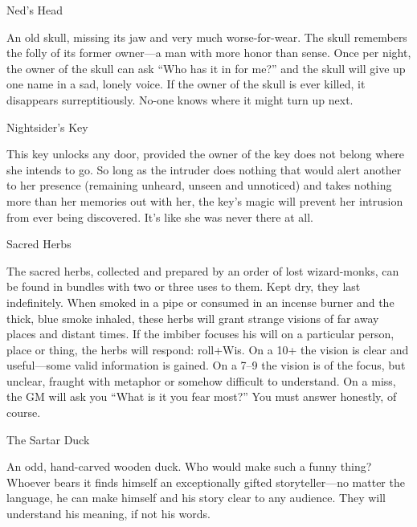  

Ned's Head	 

 

An old skull, missing its jaw and very much worse-for-wear. The skull remembers the folly of its former owner—a man with more honor than sense. Once per night, the owner of the skull can ask “Who has it in for me?” and the skull will give up one name in a sad, lonely voice. If the owner of the skull is ever killed, it disappears surreptitiously. No-one knows where it might turn up next.

 

Nightsider's Key	 

 

This key unlocks any door, provided the owner of the key does not belong where she intends to go. So long as the intruder does nothing that would alert another to her presence (remaining unheard, unseen and unnoticed) and takes nothing more than her memories out with her, the key’s magic will prevent her intrusion from ever being discovered. It’s like she was never there at all.

 

Sacred Herbs	 

 

The sacred herbs, collected and prepared by an order of lost wizard-monks, can be found in bundles with two or three uses to them. Kept dry, they last indefinitely. When smoked in a pipe or consumed in an incense burner and the thick, blue smoke inhaled, these herbs will grant strange visions of far away places and distant times. If the imbiber focuses his will on a particular person, place or thing, the herbs will respond: roll+Wis. On a 10+ the vision is clear and useful—some valid information is gained. On a 7–9 the vision is of the focus, but unclear, fraught with metaphor or somehow difficult to understand. On a miss, the GM will ask you “What is it you fear most?” You must answer honestly, of course.

 

The Sartar Duck	 

 

An odd, hand-carved wooden duck. Who would make such a funny thing? Whoever bears it finds himself an exceptionally gifted storyteller—no matter the language, he can make himself and his story clear to any audience. They will understand his meaning, if not his words.

 

